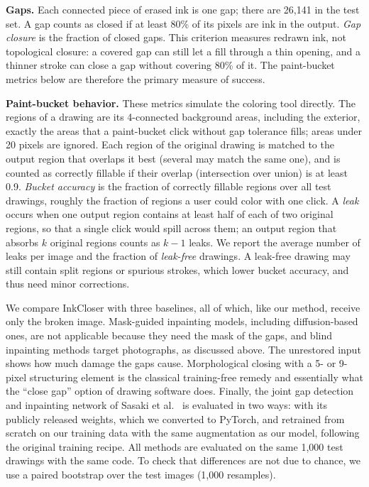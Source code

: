 \documentclass{IEEEcsmag}
\begin{document}
\textbf{Gaps.} Each connected piece of erased ink is one gap; there are 26,141 in the
test set. A gap counts as closed if at least 80\% of its pixels are ink in the
output. \emph{Gap closure} is the fraction of closed gaps. This criterion measures
redrawn ink, not topological closure: a covered gap can still let a fill through a
thin opening, and a thinner stroke can close a gap without covering 80\% of it. The
paint-bucket metrics below are therefore the primary measure of success.

\textbf{Paint-bucket behavior.} These metrics simulate the coloring tool directly.
The regions of a drawing are its 4-connected background areas, including the
exterior, exactly the areas that a paint-bucket click without gap tolerance fills;
areas under 20 pixels are ignored. Each region of the original drawing is matched to
the output region that overlaps it best (several may match the same one), and is counted as correctly fillable if their overlap (intersection over
union) is at least 0.9. \emph{Bucket accuracy} is the fraction of correctly fillable
regions over all test drawings, roughly the fraction of regions a user could color with one click. A
\emph{leak} occurs when one output region contains at least half of each of two
original regions, so that a single click would spill across them; an output region
that absorbs $k$ original regions counts as $k-1$ leaks. We report the average
number of leaks per image and the fraction of \emph{leak-free} drawings. A leak-free
drawing may still contain split regions or spurious strokes, which lower bucket
accuracy, and thus need minor corrections.

We compare InkCloser with three baselines, all of which, like our method, receive
only the broken image. Mask-guided inpainting models, including diffusion-based ones,
are not applicable because they need the mask of the gaps, and blind inpainting
methods target photographs, as discussed above. The unrestored input shows how much damage the gaps cause.
Morphological closing with a 5- or 9-pixel structuring element is the classical
training-free remedy and essentially what the ``close gap'' option of drawing software
does. Finally, the joint gap detection and inpainting network of Sasaki et
al.~\cite{sasaki2017joint} is evaluated in two ways: with its publicly released
weights, which we converted to PyTorch, and retrained from scratch on our training
data with the same augmentation as our model, following the original training
recipe. All methods are evaluated on the same 1,000 test drawings with the same code.
To check that differences are not due to chance, we use a paired bootstrap over the
test images (1,000 resamples).
\end{document}
